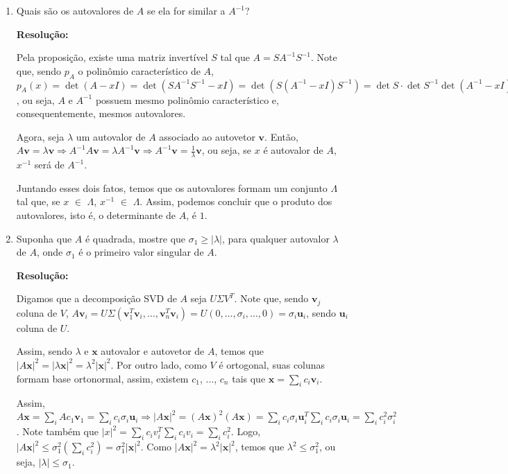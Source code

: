 \documentclass[leqno]{article}
\begin{document}
\begin{enumerate}
    \item Quais são os autovalores de $A$ se ela for similar a $A^{-1}$?
    
    \textbf{Resolução:}
    
    Pela proposição, existe uma matriz invertível $S$ tal que $A=SA^{-1}S^{-1}$. Note que, sendo $p_A$ o polinômio característico de $A$, $p_A(x)=\det (A-xI)=\det(SA^{-1}S^{-1}-xI)=\det(S(A^{-1}-xI)S^{-1})=\det S\cdot\det S^{-1}\det(A^{-1}-xI)=p_{A^{-1}}(x)$, ou seja, $A$ e $A^{-1}$ possuem mesmo polinômio característico e, consequentemente, mesmos autovalores.
    
    Agora, seja $\lambda$ um autovalor de $A$ associado ao autovetor $\textbf{v}$. Então, $A\textbf{v}=\lambda\textbf{v}\Rightarrow A^{-1}A\textbf{v}=\lambda A^{-1}\textbf{v}\Rightarrow A^{-1}\textbf{v}=\frac{1}{\lambda}\textbf{v}$, ou seja, se $x$ é autovalor de $A$, $x^{-1}$ será de $A^{-1}$.
    
    Juntando esses dois fatos, temos que os autovalores formam um conjunto $\Lambda$ tal que, se $x$ $\in$ $\Lambda$, $x^{-1}$ $\in$ $\Lambda$. Assim, podemos concluir que o produto dos autovalores, isto é, o determinante de $A$, é $1$.
    
    \item Suponha que $A$ é quadrada, mostre que $\sigma_1\geq|\lambda|$, para qualquer autovalor $\lambda$ de $A$, onde $\sigma_1$ é o primeiro valor singular de $A$.
    
    \textbf{Resolução:}
    
    Digamos que a decomposição SVD de $A$ seja $U\Sigma V^T$. Note que, sendo $\textbf{v}_j$ coluna de $V$, $A\textbf{v}_i=U\Sigma (\textbf{v}_1^T\textbf{v}_i,\dots,\textbf{v}_n^T\textbf{v}_i)=U(0,\dots,\sigma_i,\dots,0)=\sigma_i\textbf{u}_i$, sendo $\textbf{u}_i$ coluna de $U$.
    
    Assim, sendo $\lambda$ e $\textbf{x}$ autovalor e autovetor de $A$, temos que $|A\textbf{x}|^2=|\lambda\textbf{x}|^2=\lambda^2|\textbf{x}|^2$. Por outro lado, como $V$ é ortogonal, suas colunas formam base ortonormal, assim, existem $c_1$, $\dots$, $c_n$ tais que $\textbf{x}=\sum_i c_i\textbf{v}_i$.
    
    Assim, $A\textbf{x}=\sum_iAc_1\textbf{v}_1=\sum_ic_i\sigma_i\textbf{u}_i\Rightarrow |A\textbf{x}|^2=(A\textbf{x})^2(A\textbf{x})=\sum_ic_i\sigma_i\textbf{u}_i^T\sum_ic_i\sigma_i\textbf{u}_i=\sum_ic_i^2\sigma_i^2$. Note também que $|x|^2=\sum_ic_iv_i^T\sum_ic_iv_i=\sum_ic^2_i$. Logo, $|A\textbf{x}|^2\leq\sigma_1^2(\sum_ic_i^2)=\sigma_1^2|\textbf{x}|^2$. Como $|A\textbf{x}|^2=\lambda^2|\textbf{x}|^2$, temos que $\lambda^2\leq\sigma^2_1$, ou seja, $|\lambda|\leq\sigma_1$.
    

\end{enumerate}
\end{document}
